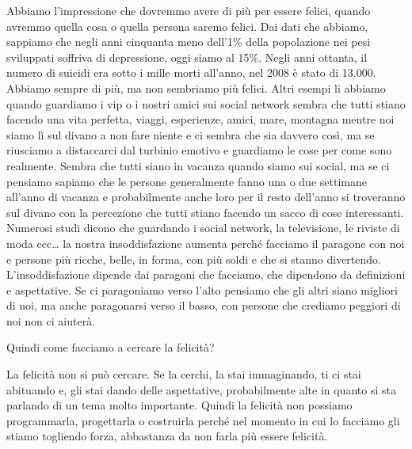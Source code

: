 \documentclass[12pt]{book} %
\begin{document}
Abbiamo l'impressione che dovremmo avere di più per essere felici, quando avremmo quella cosa o
quella persona saremo felici. Dai dati che abbiamo, sappiamo che negli anni cinquanta meno
dell'1\% della popolazione nei pesi sviluppati soffriva di depressione, oggi siamo al 15\%. Negli
anni ottanta, il numero di suicidi era sotto i mille morti all'anno, nel 2008 è stato di 13.000.
Abbiamo sempre di più, ma non sembriamo più felici. Altri esempi li abbiamo quando guardiamo i vip o i nostri amici sui
social network sembra che tutti stiano facendo una vita perfetta, viaggi, esperienze, amici, mare, montagna mentre noi
siamo lì sul divano a non fare niente e ci sembra che sia davvero così, ma se riusciamo a distaccarci dal turbinio
emotivo e guardiamo le cose per come sono realmente. Sembra che tutti siano in vacanza quando siamo sui social, ma se
ci pensiamo sapiamo che le persone generalmente fanno una o due settimane all'anno di vacanza e
probabilmente anche loro per il resto dell'anno si troveranno sul divano con la percezione che
tutti stiano facendo un sacco di cose interessanti. Numerosi studi dicono che guardando i social network, la
televisione, le riviste di moda ecc… la nostra insoddisfazione aumenta perché facciamo il paragone con noi e persone
più ricche, belle, in forma, con più soldi e che si stanno divertendo. L'insoddisfazione dipende dai paragoni che
facciamo, che dipendono da definizioni e aspettative. Se ci paragoniamo verso l'alto pensiamo che gli altri siano
migliori di noi, ma anche paragonarsi verso il basso, con persone che crediamo peggiori di noi non ci aiuterà.

Quindi come facciamo a cercare la felicità? 

La felicità non si può cercare. Se la cerchi, la stai immaginando, ti ci stai abituando e, gli stai dando delle
aspettative, probabilmente alte in quanto si sta parlando di un tema molto importante. Quindi la felicità non possiamo
programmarla, progettarla o costruirla perché nel momento in cui lo facciamo gli stiamo togliendo forza, abbastanza da
non farla più essere felicità.
\end{document}
